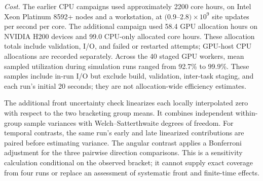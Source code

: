 \textit{Cost.} The earlier CPU campaigns used approximately 2200 core hours,
on Intel Xeon Platinum 8592+ nodes and a workstation, at
$(0.9$--$2.8)\times10^9$ site updates per second per core. The additional
campaign used 58.4 GPU allocation hours on NVIDIA H200 devices and
99.0 CPU-only allocated core hours. These allocation totals include validation,
I/O, and failed or restarted attempts; GPU-host CPU allocations are recorded
separately. Across the 40 staged GPU workers, mean sampled utilization during
simulation runs ranged from 92.7\% to 99.9\%. These samples include in-run
I/O but exclude build, validation, inter-task staging, and each run's initial
20 seconds; they are not allocation-wide efficiency estimates.

The additional front uncertainty check linearizes each locally interpolated
zero with respect to the two bracketing group means. It combines independent
within-group sample variances with Welch--Satterthwaite degrees of freedom.
For temporal contrasts, the same run's early and late linearized contributions
are paired before estimating variance. The angular contrast applies a
Bonferroni adjustment for the three pairwise direction comparisons. This is
a sensitivity calculation conditional on the observed bracket; it cannot
supply exact coverage from four runs or replace an assessment of systematic
front and finite-time effects.

